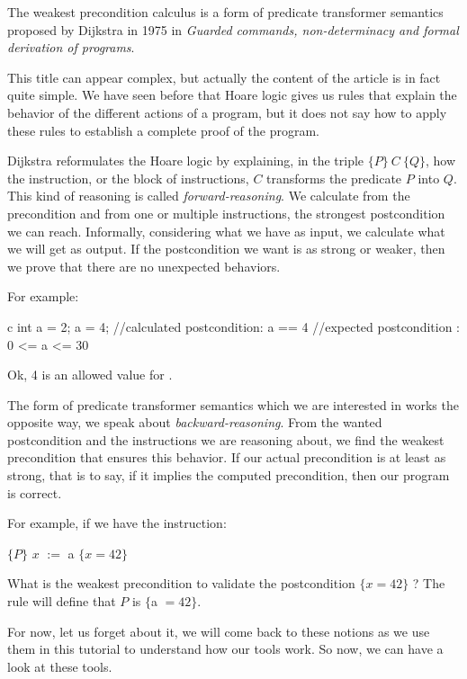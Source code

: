 

The weakest precondition calculus is a form of predicate transformer
semantics proposed by Dijkstra in 1975 in \emph{Guarded commands,
non-determinacy and formal derivation of programs}.

This title can appear complex, but actually the content of the article is in
fact quite simple. We have seen before that Hoare logic gives us rules that
explain the behavior of the different actions of a program, but it does not say
how to apply these rules to establish a complete proof of the program.

Dijkstra reformulates the Hoare logic by explaining, in the triple
$\{P\}\ C\ \{Q\}$, how the instruction, or the block of instructions,
$C$ transforms the predicate $P$ into $Q$. This kind of reasoning is
called \emph{forward-reasoning}. We calculate from the precondition and
from one or multiple instructions, the strongest postcondition we can
reach. Informally, considering what we have as input, we calculate what
we will get as output. If the postcondition we want is as strong or
weaker, then we prove that there are no unexpected behaviors.



For example:



\begin{CodeBlock}{c}
int a = 2;
a = 4;
//calculated postcondition: a == 4
//expected postcondition  : 0 <= a <= 30
\end{CodeBlock}



Ok, 4 is an allowed value for .



The form of predicate transformer semantics which we are interested in
works the opposite way, we speak about \emph{backward-reasoning}. From
the wanted postcondition and the instructions we are reasoning about, we
find the weakest precondition that ensures this behavior. If our actual
precondition is at least as strong, that is to say, if it implies the
computed precondition, then our program is correct.



For example, if we have the instruction:



$\{P\}$ $x$ $:=$ a $\{x = 42\}$



What is the weakest precondition to validate the postcondition
$\{x = 42\}$ ? The rule will define that $P$ is $\{$a $=42\}$.



For now, let us forget about it, we will come back to these notions as
we use them in this tutorial to understand how our tools work. So now,
we can have a look at these tools.
